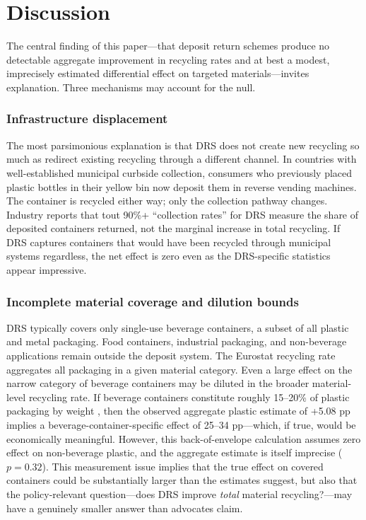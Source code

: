 \documentclass[12pt]{article}
\begin{document}
\section{Discussion}
\label{sec:discussion}

The central finding of this paper---that deposit return schemes produce no detectable aggregate improvement in recycling rates and at best a modest, imprecisely estimated differential effect on targeted materials---invites explanation. Three mechanisms may account for the null.

\subsubsection*{Infrastructure displacement} The most parsimonious explanation is that DRS does not create new recycling so much as redirect existing recycling through a different channel. In countries with well-established municipal curbside collection, consumers who previously placed plastic bottles in their yellow bin now deposit them in reverse vending machines. The container is recycled either way; only the collection pathway changes. Industry reports that tout 90\%+ ``collection rates'' for DRS measure the share of deposited containers returned, not the marginal increase in total recycling. If DRS captures containers that would have been recycled through municipal systems regardless, the net effect is zero even as the DRS-specific statistics appear impressive.

\subsubsection*{Incomplete material coverage and dilution bounds} DRS typically covers only single-use beverage containers, a subset of all plastic and metal packaging. Food containers, industrial packaging, and non-beverage applications remain outside the deposit system. The Eurostat recycling rate aggregates all packaging in a given material category. Even a large effect on the narrow category of beverage containers may be diluted in the broader material-level recycling rate. If beverage containers constitute roughly 15--20\% of plastic packaging by weight \citep{oecd2022plasticpollution}, then the observed aggregate plastic estimate of +5.08 pp implies a beverage-container-specific effect of 25--34 pp---which, if true, would be economically meaningful. However, this back-of-envelope calculation assumes zero effect on non-beverage plastic, and the aggregate estimate is itself imprecise ($p = 0.32$). This measurement issue implies that the true effect on covered containers could be substantially larger than the estimates suggest, but also that the policy-relevant question---does DRS improve \textit{total} material recycling?---may have a genuinely smaller answer than advocates claim.
\end{document}
